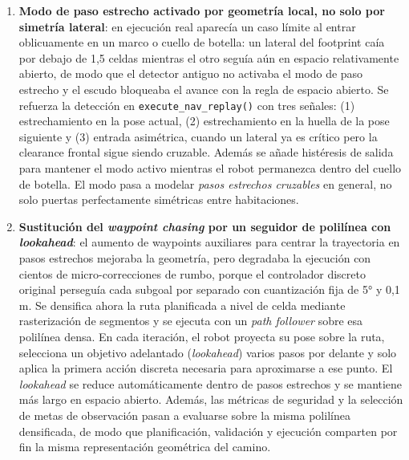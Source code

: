 \begin{enumerate}
  \item \textbf{Modo de paso estrecho activado por geometría local, no solo por
        simetría lateral}: en ejecución real aparecía un caso límite al entrar
        oblicuamente en un marco o cuello de botella: un lateral del footprint
        caía por debajo de 1{,}5 celdas mientras el otro seguía aún en espacio
        relativamente abierto, de modo que el detector antiguo no activaba el
        modo de paso estrecho y el escudo bloqueaba el avance con la regla de
        espacio abierto. Se refuerza la detección en
        \texttt{execute\_nav\_replay()} con tres señales:
        (1) estrechamiento en la pose actual, (2) estrechamiento en la huella
        de la pose siguiente y (3) entrada asimétrica, cuando un lateral ya es
        crítico pero la clearance frontal sigue siendo cruzable. Además se
        añade histéresis de salida para mantener el modo activo mientras el
        robot permanezca dentro del cuello de botella. El modo pasa a modelar
        \emph{pasos estrechos cruzables} en general, no solo puertas
        perfectamente simétricas entre habitaciones.

  \item \textbf{Sustitución del \textit{waypoint chasing} por un seguidor de
        polilínea con \textit{lookahead}}: el aumento de waypoints auxiliares
        para centrar la trayectoria en pasos estrechos mejoraba la geometría,
        pero degradaba la ejecución con cientos de micro-correcciones de rumbo,
        porque el controlador discreto original perseguía cada subgoal por
        separado con cuantización fija de 5° y 0{,}1\,m. Se densifica ahora la
        ruta planificada a nivel de celda mediante rasterización de segmentos y
        se ejecuta con un \textit{path follower} sobre esa polilínea densa. En
        cada iteración, el robot proyecta su pose sobre la ruta, selecciona un
        objetivo adelantado (\textit{lookahead}) varios pasos por delante y
        solo aplica la primera acción discreta necesaria para aproximarse a ese
        punto. El \textit{lookahead} se reduce automáticamente dentro de pasos
        estrechos y se mantiene más largo en espacio abierto. Además, las
        métricas de seguridad y la selección de metas de observación pasan a
        evaluarse sobre la misma polilínea densificada, de modo que
        planificación, validación y ejecución comparten por fin la misma
        representación geométrica del camino.


\end{enumerate}
